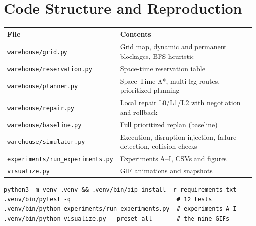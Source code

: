 \documentclass[11pt,a4paper]{article}
\begin{document}

\appendix
\section{Code Structure and Reproduction}

\begin{table}[H]
\centering\small
\begin{tabularx}{\textwidth}{@{}p{6cm}Y@{}}
\toprule
File & Contents \\
\midrule
\texttt{warehouse/grid.py} & Grid map, dynamic and permanent blockages, BFS heuristic \\
\texttt{warehouse/reservation.py} & Space-time reservation table \\
\texttt{warehouse/planner.py} & Space-Time A*, multi-leg routes, prioritized planning \\
\texttt{warehouse/repair.py} & Local repair L0/L1/L2 with negotiation and rollback \\
\texttt{warehouse/baseline.py} & Full prioritized replan (baseline) \\
\texttt{warehouse/simulator.py} & Execution, disruption injection, failure detection, collision checks \\
\texttt{experiments/run\_experiments.py} & Experiments A--I, CSVs and figures \\
\texttt{visualize.py} & GIF animations and snapshots \\
\bottomrule
\end{tabularx}
\end{table}

\begin{verbatim}
python3 -m venv .venv && .venv/bin/pip install -r requirements.txt
.venv/bin/pytest -q                              # 12 tests
.venv/bin/python experiments/run_experiments.py  # experiments A-I
.venv/bin/python visualize.py --preset all       # the nine GIFs
\end{verbatim}
\end{document}
